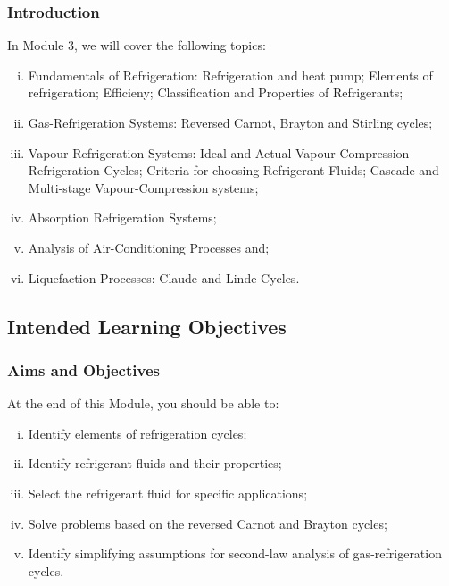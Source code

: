 \documentclass[10pt,compress]{beamer}
\begin{document}
\begin{frame}
 \frametitle{Introduction}
  In Module 3, we will cover the following topics:
  \begin{enumerate}[(i)]
   \item <1-> Fundamentals of Refrigeration: Refrigeration and heat pump; Elements of refrigeration; Efficieny; Classification and Properties of Refrigerants;
   \item <2-> Gas-Refrigeration Systems: Reversed Carnot, Brayton and Stirling cycles;
   \item <3-> Vapour-Refrigeration Systems: Ideal and Actual Vapour-Compression Refrigeration Cycles; Criteria for choosing Refrigerant Fluids; Cascade and Multi-stage Vapour-Compression systems;
   \item <4-> Absorption Refrigeration Systems;
   \item <5-> Analysis of Air-Conditioning Processes and;
   \item <6-> Liquefaction Processes: Claude and Linde Cycles.
  \end{enumerate}
\end{frame}

\subsection{Intended Learning Objectives}
\begin{frame}
 \frametitle{Aims and Objectives}
  At the end of this Module, you should be able to:
  \begin{enumerate}[(i)]
   \item <1-> Identify elements of refrigeration cycles;
   \item <2-> Identify refrigerant fluids and their properties;
   \item <3-> Select the refrigerant fluid for specific applications;
   \item <4-> Solve problems based on the reversed Carnot and Brayton cycles;
   \item <5-> Identify simplifying assumptions for second-law analysis of gas-refrigeration cycles.
  \end{enumerate}
\end{frame}


\end{document}
